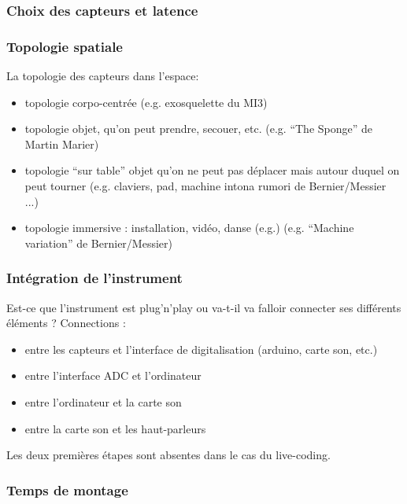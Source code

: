 \subsubsection{Choix des capteurs et latence}




\subsubsection{Topologie spatiale}

La topologie des capteurs dans l'espace:
\vspace{-1em}
\begin{itemize}[noitemsep]
	\item topologie corpo-centrée (e.g. exosquelette du MI3)
	\item topologie objet, qu'on peut prendre, secouer, etc. (e.g. ``The Sponge'' de Martin Marier)
	\item topologie ``sur table'' objet qu'on ne peut pas déplacer mais autour duquel on peut tourner (e.g. claviers, pad, machine intona rumori de Bernier/Messier ...)
	\item topologie immersive : installation, vidéo, danse (e.g.) (e.g. ``Machine variation'' de Bernier/Messier)
\end{itemize}



\subsubsection{Intégration de l'instrument}

Est-ce que l'instrument est plug'n'play ou va-t-il va falloir connecter ses différents éléments ? Connections : 
\vspace{-1em}
\begin{itemize}[noitemsep]
	\item entre les capteurs et l'interface de digitalisation (arduino, carte son, etc.)
	\item entre l'interface ADC et l'ordinateur
	\item entre l'ordinateur et la carte son
	\item entre la carte son et les haut-parleurs
\end{itemize}

Les deux premières étapes sont absentes dans le cas du live-coding.


\subsubsection{Temps de montage}

